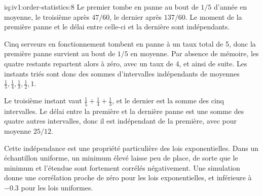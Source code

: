 \begin{solution}{iq:iv1:order-statistics:8}
Le premier tombe en panne au bout de $1/5$ d'année en moyenne, le troisième après $47/60$, le dernier après $137/60$. Le moment de la première panne et le délai entre celle-ci et la dernière sont indépendants.

Cinq serveurs en fonctionnement tombent en panne à un taux total de 5, donc la première panne survient au bout de $1/5$ en moyenne. Par absence de mémoire, les quatre restants repartent alors à zéro, avec un taux de 4, et ainsi de suite. Les instants triés sont donc des sommes d'intervalles indépendants de moyennes $\tfrac15, \tfrac14, \tfrac13, \tfrac12, 1$.

Le troisième instant vaut $\tfrac15 + \tfrac14 + \tfrac13$, et le dernier est la somme des cinq intervalles. Le délai entre la première et la dernière panne est une somme des quatre autres intervalles, donc il est indépendant de la première, avec pour moyenne $25/12$.

Cette indépendance est une propriété particulière des lois exponentielles. Dans un échantillon uniforme, un minimum élevé laisse peu de place, de sorte que le minimum et l'étendue sont fortement corrélés négativement. Une simulation donne une corrélation proche de zéro pour les lois exponentielles, et inférieure à $-0.3$ pour les lois uniformes.

\end{solution}

